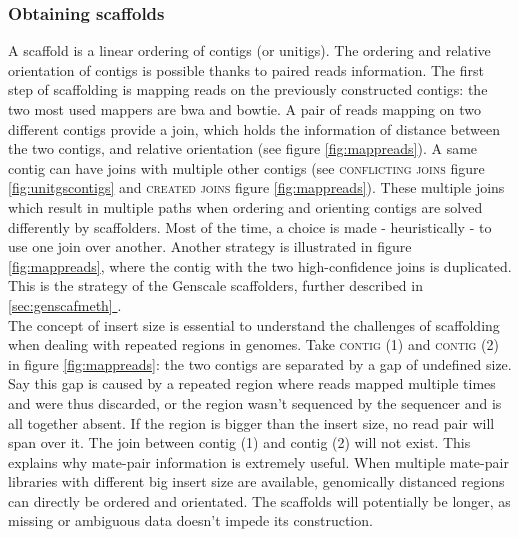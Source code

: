 \documentclass[12pt, twocolumn]{article}
\newcommand*{\fulleref}[1]{\hyperref[{#1}]{\autoref*{#1} \nameref*{#1}}}
\begin{document}
\subsubsection{Obtaining scaffolds}
A scaffold is a linear ordering of contigs (or unitigs). The ordering and relative orientation of contigs is possible thanks to paired reads information. The first step of scaffolding is mapping reads on the previously constructed contigs: the two most used mappers are bwa \cite{li_fast_2009} and bowtie\cite{langmead_fast_2012,langmead_ultrafast_2009}. A pair of reads mapping on two different contigs provide a join, which holds the information of distance between the two contigs, and relative orientation (see figure \ref{fig:mappreads}).  A same contig can have joins with multiple  other contigs (see \textsc{conflicting joins} figure \ref{fig:unitgscontigs} and \textsc{created joins} figure \ref{fig:mappreads}). These multiple joins which result in multiple paths when ordering and orienting contigs are solved differently by scaffolders. Most of the time, a choice is made - heuristically - to use one join over another. Another strategy is illustrated in figure \ref{fig:mappreads}, where the contig with the two high-confidence joins is duplicated. This is the strategy of the Genscale scaffolders, further described in \fulleref{sec:genscafmeth}. \\
The concept of insert size is essential to understand the challenges of scaffolding when dealing with repeated regions in genomes. Take \textsc{contig (1)} and \textsc{contig (2)} in figure \ref{fig:mappreads}: the two contigs are separated by a gap of undefined size. Say this gap is caused by a repeated region where reads mapped multiple times and were thus discarded, or the region wasn't sequenced by the sequencer and is all together absent. If the region is bigger than the insert size, no read pair will span over it. The join between contig (1) and contig (2) will not exist. This explains why mate-pair information is extremely useful. When multiple mate-pair libraries with different big insert size are available, genomically distanced regions can directly be ordered and orientated. The scaffolds will potentially be longer, as missing or ambiguous data doesn't impede its construction.
\end{document}
